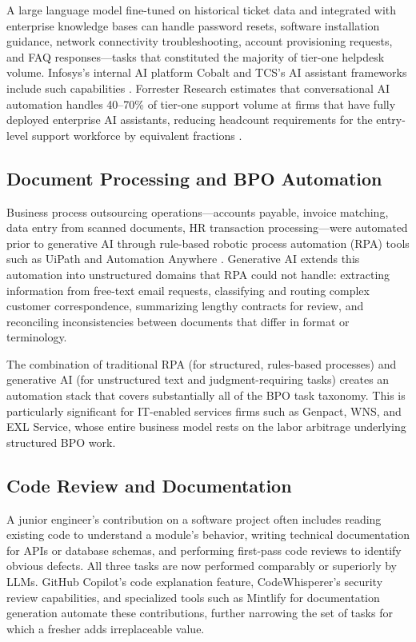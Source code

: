 \documentclass[conference]{IEEEtran}
\begin{document}
A large language model fine-tuned on historical ticket data and integrated with enterprise knowledge bases can handle password resets, software installation guidance, network connectivity troubleshooting, account provisioning requests, and FAQ responses---tasks that constituted the majority of tier-one helpdesk volume. Infosys's internal AI platform Cobalt and TCS's AI assistant frameworks include such capabilities \cite{tcs2023annual}. Forrester Research estimates that conversational AI automation handles 40--70\% of tier-one support volume at firms that have fully deployed enterprise AI assistants, reducing headcount requirements for the entry-level support workforce by equivalent fractions \cite{forrester2023ai}.

\subsection{Document Processing and BPO Automation}

Business process outsourcing operations---accounts payable, invoice matching, data entry from scanned documents, HR transaction processing---were automated prior to generative AI through rule-based robotic process automation (RPA) tools such as UiPath and Automation Anywhere \cite{willcocks2016robotic}. Generative AI extends this automation into unstructured domains that RPA could not handle: extracting information from free-text email requests, classifying and routing complex customer correspondence, summarizing lengthy contracts for review, and reconciling inconsistencies between documents that differ in format or terminology.

The combination of traditional RPA (for structured, rules-based processes) and generative AI (for unstructured text and judgment-requiring tasks) creates an automation stack that covers substantially all of the BPO task taxonomy. This is particularly significant for IT-enabled services firms such as Genpact, WNS, and EXL Service, whose entire business model rests on the labor arbitrage underlying structured BPO work.

\subsection{Code Review and Documentation}

A junior engineer's contribution on a software project often includes reading existing code to understand a module's behavior, writing technical documentation for APIs or database schemas, and performing first-pass code reviews to identify obvious defects. All three tasks are now performed comparably or superiorly by LLMs. GitHub Copilot's code explanation feature, CodeWhisperer's security review capabilities, and specialized tools such as Mintlify for documentation generation automate these contributions, further narrowing the set of tasks for which a fresher adds irreplaceable value.
\end{document}
